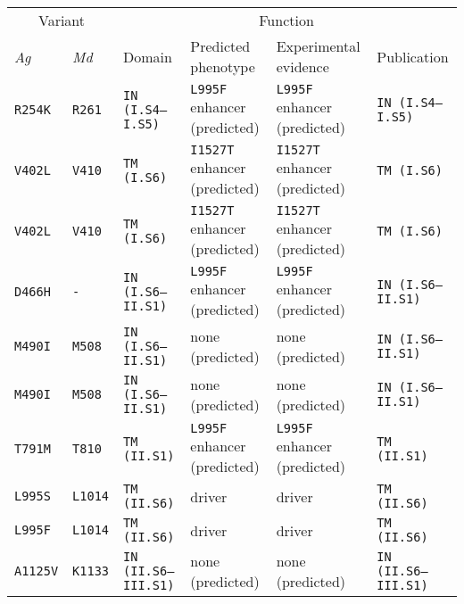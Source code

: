 
\begin{tabular}{llllll}
\toprule
\multicolumn{2}{c}{Variant} &
\multicolumn{4}{c}{Function}\\
\cmidrule(r){1-2}
\cmidrule(r){3-6}
\emph{Ag} & 
\emph{Md} & Domain\tnote{1} & 
Predicted phenotype\tnote{2} &
Experimental evidence\tnote{3} &
Publication\\
\midrule

\texttt{R254K} & \texttt{R261} & \texttt{IN (I.S4--I.S5)} & \texttt{L995F} enhancer (predicted) & \texttt{L995F} enhancer (predicted) & \texttt{IN (I.S4--I.S5)} \\

\texttt{V402L} & \texttt{V410} & \texttt{TM (I.S6)} & \texttt{I1527T} enhancer (predicted) & \texttt{I1527T} enhancer (predicted) & \texttt{TM (I.S6)} \\

\texttt{V402L} & \texttt{V410} & \texttt{TM (I.S6)} & \texttt{I1527T} enhancer (predicted) & \texttt{I1527T} enhancer (predicted) & \texttt{TM (I.S6)} \\

\texttt{D466H} & \texttt{-} & \texttt{IN (I.S6--II.S1)} & \texttt{L995F} enhancer (predicted) & \texttt{L995F} enhancer (predicted) & \texttt{IN (I.S6--II.S1)} \\

\texttt{M490I} & \texttt{M508} & \texttt{IN (I.S6--II.S1)} & none (predicted) & none (predicted) & \texttt{IN (I.S6--II.S1)} \\

\texttt{M490I} & \texttt{M508} & \texttt{IN (I.S6--II.S1)} & none (predicted) & none (predicted) & \texttt{IN (I.S6--II.S1)} \\

\texttt{T791M} & \texttt{T810} & \texttt{TM (II.S1)} & \texttt{L995F} enhancer (predicted) & \texttt{L995F} enhancer (predicted) & \texttt{TM (II.S1)} \\

\texttt{L995S} & \texttt{L1014} & \texttt{TM (II.S6)} & driver & driver & \texttt{TM (II.S6)} \\

\texttt{L995F} & \texttt{L1014} & \texttt{TM (II.S6)} & driver & driver & \texttt{TM (II.S6)} \\

\texttt{A1125V} & \texttt{K1133} & \texttt{IN (II.S6--III.S1)} & none (predicted) & none (predicted) & \texttt{IN (II.S6--III.S1)} \\


\end{tabular}
